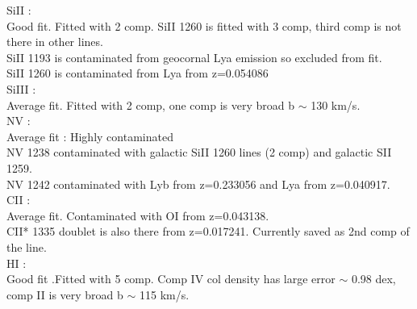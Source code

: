 \documentclass[12pt,draft]{report}
\begin{document}
SiII :  \\  \hspace*{1.5cm}
        Good fit. Fitted with 2 comp. SiII 1260 is fitted with 3 comp, third comp is not there in other lines.  \\
        SiII 1193 is contaminated from geocornal Lya emission so excluded from fit. \\
        SiII 1260 is contaminated from Lya from z=0.054086 \\

SiIII :  \\  \hspace*{1.5cm}
        Average fit. Fitted with 2 comp, one comp is very broad b $\sim$ 130 km/s. \\

NV :  \\  \hspace*{1.5cm}
        Average fit  :  Highly contaminated  \\
        NV 1238 contaminated with galactic SiII 1260 lines (2 comp) and galactic SII 1259.  \\
        NV 1242 contaminated with Lyb from z=0.233056 and Lya from z=0.040917.  \\

CII :  \\  \hspace*{1.5cm}
        Average fit. Contaminated with OI from z=0.043138.   \\
        CII* 1335 doublet is also there from z=0.017241. Currently saved as 2nd comp of the line.  \\

HI :  \\  \hspace*{1.5cm}
        Good fit .Fitted with 5 comp. Comp IV col density has large error $\sim$ 0.98 dex, comp II is very broad b $\sim$ 115 km/s.
\end{document}
